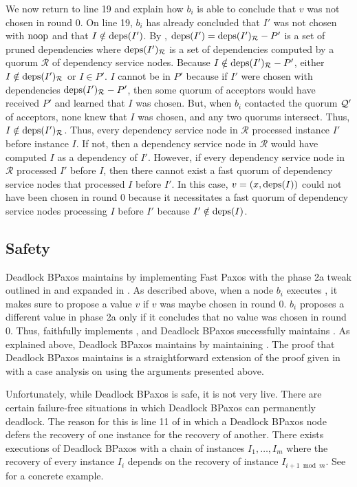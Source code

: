 We now return to line 19 and explain how $b_i$ is able to conclude that $v$ was
not chosen in round $0$. On line 19, $b_i$ has already concluded that $I'$ was
not chosen with $\text{noop}$ and that $I \notin \text{deps}(I')$. By
, $\text{deps}(I') = \text{deps}(I')_{\mathcal{R}} - P'$ is a
set of pruned dependencies where $\text{deps}(I')_{\mathcal{R}}$ is a set of
dependencies computed by a quorum $\mathcal{R}$ of dependency service nodes.
Because $I \notin \text{deps}(I')_{\mathcal{R}} - P'$, either $I \notin
\text{deps}(I')_{\mathcal{R}}$ or $I \in P'$.
%
$I$ cannot be in $P'$ because if $I'$ were chosen with dependencies
$\text{deps}(I')_{\mathcal{R}} - P'$, then some quorum of acceptors would have
received $P'$ and learned that $I$ was chosen. But, when $b_i$ contacted the
quorum $\mathcal{Q}'$ of acceptors, none knew that $I$ was chosen, and any two
quorums intersect.
%
Thus, $I \notin \text{deps}(I')_{\mathcal{R}}$. Thus, every dependency service node
in $\mathcal{R}$ processed instance $I'$ before instance $I$. If not, then a
dependency service node in $\mathcal{R}$ would have computed $I$ as a
dependency of $I'$. However, if every dependency service node in $\mathcal{R}$
processed $I'$ before $I$, then there cannot exist a fast quorum of dependency
service nodes that processed $I$ before $I'$. In this case, $v = (x, \text{deps}(I))$
could not have been chosen in round $0$ because it necessitates a fast quorum
of dependency service nodes processing $I$ before $I'$ because $I' \notin
\text{deps}(I)$.

\subsection{Safety}
Deadlock BPaxos maintains  by implementing Fast
Paxos with the phase 2a tweak outlined in  and expanded
in . As described above, when a node $b_i$ executes
, it makes sure to propose a value $v$ if $v$ was maybe
chosen in round $0$. $b_i$ proposes a different value in phase 2a only if it
concludes that no value was chosen in round $0$. Thus, 
faithfully implements , and Deadlock BPaxos
successfully maintains .
%
As explained above, Deadlock BPaxos maintains  by
maintaining . The proof that Deadlock BPaxos
maintains  is a straightforward extension of the
proof given in  with a case analysis on
 using the arguments presented above.

Unfortunately, while Deadlock BPaxos is safe, it is not very live. There are
certain failure-free situations in which Deadlock BPaxos can permanently
deadlock. The reason for this is line 11 of  in which a
Deadlock BPaxos node defers the recovery of one instance for the recovery of
another.  There exists executions of Deadlock BPaxos with a chain of instances
$I_1, \ldots, I_m$ where the recovery of every instance $I_i$ depends on the
recovery of instance $I_{i+1 \bmod m}$. See
 for a concrete example.
